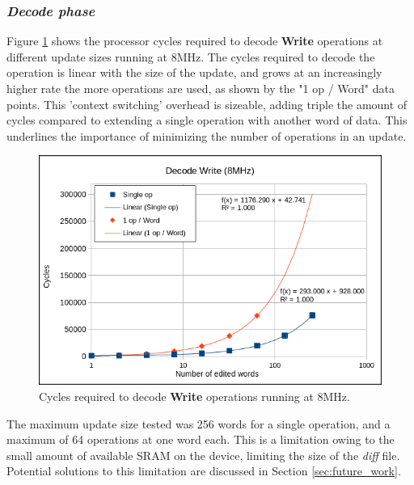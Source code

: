 \subsubsection*{\textbf{\textit{Decode phase}}}
Figure \ref{fig:wDecode8} shows the processor cycles required to decode \textbf{Write} operations at different update sizes running at 8MHz. The cycles required to decode the operation is linear with the size of the update, and grows at an increasingly higher rate the more operations are used, as shown by the "1 op / Word" data points. This 'context switching' overhead is sizeable, adding triple the amount of cycles compared to extending a single operation with another word of data. This underlines the importance of minimizing the number of operations in an update.
\begin{figure}[!ht]
    \begin{shaded}
        \centering
        \includegraphics[width=\figurewidth]{img/WDecode8.png}
        \caption{Cycles required to decode \textbf{Write} operations running at 8MHz.}
        \label{fig:wDecode8}
    \end{shaded}
\end{figure}
The maximum update size tested was 256 words for a single operation, and a maximum of 64 operations at one word each. This is a limitation owing to the small amount of available SRAM on the device, limiting the size of the \textit{diff} file. Potential solutions to this limitation are discussed in Section \ref{sec:future_work}. 

